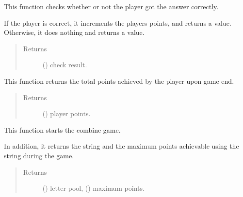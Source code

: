 \documentclass[letterpaper,10pt,english,openany,oneside]{sphinxmanual}
\begin{document}
\begin{fulllineitems}
\label{\detokenize{index:engine.combine_correct}}
This function checks whether or not the player got the answer correctly.

If the player is correct, it increments the players points, and returns
a  value. Otherwise, it does nothing and returns a  value.
\begin{quote}\begin{description}
\item[{Returns}] \leavevmode
() check result.

\end{description}\end{quote}

\end{fulllineitems}


\begin{fulllineitems}
\label{\detokenize{index:engine.combine_end}}
This function returns the total points achieved by the player
upon game end.
\begin{quote}\begin{description}
\item[{Returns}] \leavevmode
() player points.

\end{description}\end{quote}

\end{fulllineitems}


\begin{fulllineitems}
\label{\detokenize{index:engine.combine_init}}
This function starts the combine game.

In addition, it returns the string and the maximum points achievable
using the string during the game.
\begin{quote}\begin{description}
\item[{Returns}] \leavevmode
() letter pool, () maximum points.

\end{description}\end{quote}

\end{fulllineitems}
\end{document}
